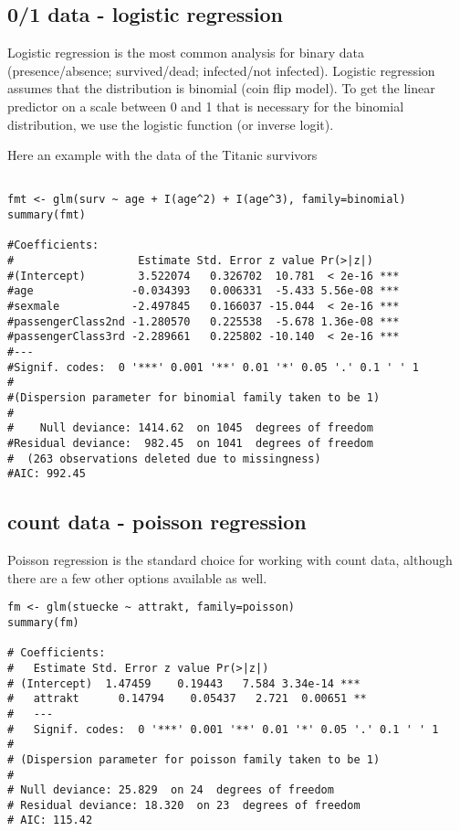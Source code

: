 \documentclass[a4paper,twoside]{tufte-book} %
\begin{document}
\subsection{0/1 data - logistic regression}

Logistic regression is the most common analysis for binary data (presence/absence; survived/dead; infected/not infected). Logistic regression assumes that the distribution is binomial (coin flip model). To get the linear predictor on a scale between 0 and 1 that is necessary for the binomial distribution, we use the logistic function (or inverse logit). 

Here an example with the data of the Titanic survivors
\begin{lstlisting}

fmt <- glm(surv ~ age + I(age^2) + I(age^3), family=binomial)
summary(fmt)

#Coefficients:
#                   Estimate Std. Error z value Pr(>|z|)    
#(Intercept)        3.522074   0.326702  10.781  < 2e-16 ***
#age               -0.034393   0.006331  -5.433 5.56e-08 ***
#sexmale           -2.497845   0.166037 -15.044  < 2e-16 ***
#passengerClass2nd -1.280570   0.225538  -5.678 1.36e-08 ***
#passengerClass3rd -2.289661   0.225802 -10.140  < 2e-16 ***
#---
#Signif. codes:  0 '***' 0.001 '**' 0.01 '*' 0.05 '.' 0.1 ' ' 1
#
#(Dispersion parameter for binomial family taken to be 1)
#
#    Null deviance: 1414.62  on 1045  degrees of freedom
#Residual deviance:  982.45  on 1041  degrees of freedom
#  (263 observations deleted due to missingness)
#AIC: 992.45

\end{lstlisting}


\subsection{count data - poisson regression}

Poisson regression is the standard choice for working with count data, although there are a few other options available as well. 

\begin{lstlisting}
fm <- glm(stuecke ~ attrakt, family=poisson)
summary(fm)

# Coefficients:
#   Estimate Std. Error z value Pr(>|z|)    
# (Intercept)  1.47459    0.19443   7.584 3.34e-14 ***
#   attrakt      0.14794    0.05437   2.721  0.00651 ** 
#   ---
#   Signif. codes:  0 '***' 0.001 '**' 0.01 '*' 0.05 '.' 0.1 ' ' 1
# 
# (Dispersion parameter for poisson family taken to be 1)
# 
# Null deviance: 25.829  on 24  degrees of freedom
# Residual deviance: 18.320  on 23  degrees of freedom
# AIC: 115.42
\end{lstlisting}



 
\end{document}
